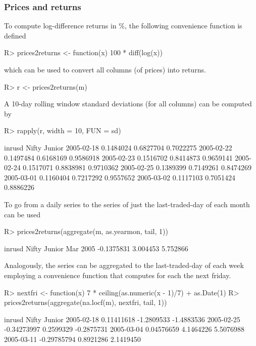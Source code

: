 \documentclass{Z}
\newcommand{\mysection}[1]{\subsubsection[#1]{\textbf{#1}}}
\begin{document}
\mysection{Prices and returns}

To compute log-difference returns in \%, the following
convenience function is defined
\begin{Schunk}
\begin{Sinput}
R> prices2returns <- function(x) 100 * diff(log(x))
\end{Sinput}
\end{Schunk}
which can be used to convert all columns (of prices) into returns.
\begin{Schunk}
\begin{Sinput}
R> r <- prices2returns(m)
\end{Sinput}
\end{Schunk}

A 10-day rolling window standard deviations (for all columns) can
be computed by
\begin{Schunk}
\begin{Sinput}
R> rapply(r, width = 10, FUN = sd)
\end{Sinput}
\begin{Soutput}
              inrusd     Nifty    Junior
2005-02-18 0.1484024 0.6827704 0.7022275
2005-02-22 0.1497484 0.6168169 0.9586918
2005-02-23 0.1516702 0.8414873 0.9659141
2005-02-24 0.1517071 0.8838981 0.9710362
2005-02-25 0.1389399 0.7149261 0.8474269
2005-03-01 0.1160404 0.7217292 0.9557652
2005-03-02 0.1117103 0.7051424 0.8886226
\end{Soutput}
\end{Schunk}

To go from a daily series to the series of just the last-traded-day of each month
 can be used
\begin{Schunk}
\begin{Sinput}
R> prices2returns(aggregate(m, as.yearmon, tail, 1))
\end{Sinput}
\begin{Soutput}
             inrusd    Nifty   Junior
Mar 2005 -0.1375831 3.004453 5.752866
\end{Soutput}
\end{Schunk}

Analogously, the series can be aggregated to the last-traded-day of each week
employing a convenience function  that computes for each 
the next friday.
\begin{Schunk}
\begin{Sinput}
R> nextfri <- function(x) 7 * ceiling(as.numeric(x - 1)/7) + as.Date(1)
R> prices2returns(aggregate(na.locf(m), nextfri, tail, 1))
\end{Sinput}
\begin{Soutput}
                inrusd      Nifty     Junior
2005-02-18  0.11411618 -1.2809533 -1.4883536
2005-02-25 -0.34273997  0.2599329 -0.2875731
2005-03-04  0.04576659  4.1464226  5.5076988
2005-03-11 -0.29785794  0.8921286  2.1419450
\end{Soutput}
\end{Schunk}
\end{document}
